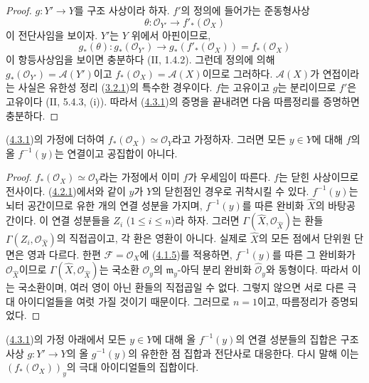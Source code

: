 \begin{proof}
$g:Y'\to Y$를 구조 사상이라 하자. $f'$의 정의에 들어가는 준동형사상
\[
\theta:\mathcal O_{Y'}\longrightarrow f'_*(\mathcal O_X)
\]
이 전단사임을 보이자. $Y'$는 $Y$ 위에서 아핀이므로,
\[
g_*(\theta):g_*(\mathcal O_{Y'})\longrightarrow
g_*(f'_*(\mathcal O_X))=f_*(\mathcal O_X)
\]
이 항등사상임을 보이면 충분하다 (II, 1.4.2). 그런데 정의에 의해
$g_*(\mathcal O_{Y'})=\mathcal A(Y')$이고
$f_*(\mathcal O_X)=\mathcal A(X)$이므로 그러하다.
$\mathcal A(X)$가 연접이라는 사실은 유한성 정리
(\hyperref[III.3.2.1-fr]{3.2.1})의 특수한 경우이다. $f$는 고유이고
$g$는 분리이므로 $f'$은 고유이다 (II, 5.4.3, (i)). 따라서
(\hyperref[III.4.3.1-fr]{4.3.1})의 증명을 끝내려면 다음 따름정리를
증명하면 충분하다.
\end{proof}

\begin{corollary}[4.3.2]
\label{III.4.3.2-fr}
(\hyperref[III.4.3.1-fr]{4.3.1})의 가정에 더하여
$f_*(\mathcal O_X)\simeq\mathcal O_Y$라고 가정하자. 그러면 모든
$y\in Y$에 대해 $f$의 올 $f^{-1}(y)$는 연결이고 공집합이 아니다.
\end{corollary}

\begin{proof}
$f_*(\mathcal O_X)\simeq\mathcal O_Y$라는 가정에서 이미 $f$가 우세임이
따른다. $f$는 닫힌 사상이므로 전사이다.
(\hyperref[III.4.2.1-fr]{4.2.1})에서와 같이 $y$가 $Y$의 닫힌점인
경우로 귀착시킬 수 있다. $f^{-1}(y)$는 뇌터 공간이므로 유한 개의 연결
성분을 가지며, $f^{-1}(y)$를 따른 완비화 $\widehat X$의 바탕공간이다.
이 연결 성분들을 $Z_i$ ($1\leq i\leq n$)라 하자. 그러면
$\Gamma(\widehat X,\mathcal O_{\widehat X})$는 환들
$\Gamma(Z_i,\mathcal O_{\widehat X})$의 직접곱이고, 각 환은 영환이
아니다. 실제로 $\widehat X$의 모든 점에서 단위원 단면은 영과 다르다.
한편 $\mathcal F=\mathcal O_X$에
(\hyperref[III.4.1.5-fr]{4.1.5})를 적용하면, $f^{-1}(y)$를 따른 그
완비화가 $\mathcal O_{\widehat X}$이므로
$\Gamma(\widehat X,\mathcal O_{\widehat X})$는 국소환
$\mathcal O_y$의 $\mathfrak m_y$-아딕 분리 완비화
$\widehat{\mathcal O}_y$와 동형이다. 따라서 이는 국소환이며, 여러
영이 아닌 환들의 직접곱일 수 없다. 그렇지 않으면 서로 다른 극대
아이디얼들을 여럿 가질 것이기 때문이다. 그러므로 $n=1$이고,
따름정리가 증명되었다.
\end{proof}

\begin{corollary}[4.3.3]
\label{III.4.3.3-fr}
(\hyperref[III.4.3.1-fr]{4.3.1})의 가정 아래에서 모든 $y\in Y$에 대해
올 $f^{-1}(y)$의 연결 성분들의 집합은 구조 사상 $g:Y'\to Y$의 올
$g^{-1}(y)$의 유한한 점 집합과 전단사로 대응한다. 다시 말해 이는
$(f_*(\mathcal O_X))_y$의 극대 아이디얼들의 집합이다.
\end{corollary}

